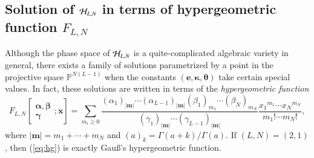 \documentclass[12pt]{article}
\numberwithin{equation}{section}
\begin{document}
\subsection{Solution of ${\cal H}_{L,N}$ in terms of hypergeometric function $F_{L,N}$}

\label{subsect:hg}


Although the phase space of ${\cal H}_{L,N}$
is a quite-complicated algebraic variety
in general,
there exists
a family of
solutions
parametrized by 
a point in the projective space
${\mathbb P}^{N(L-1)}$
when the constants $({\boldsymbol e},{\boldsymbol \kappa},{\boldsymbol \theta})$
take certain special values.
In fact, these solutions 
are written in terms of the {\it hypergeometric function} 
\begin{equation}
\label{eq:hg}
F_{L,N}
\left[
\begin{array}{c}
{\boldsymbol \alpha}, {\boldsymbol \beta} \\
{\boldsymbol  \gamma}
\end{array}
; {\boldsymbol x}
\right]
=
\sum_{m_i \geq0}
\frac{(\alpha_1)_{|{\boldsymbol m}|} \cdots (\alpha_{L-1})_{|{\boldsymbol m}|} (\beta_1)_{m_1} \cdots  (\beta_N)_{m_N} }{ (\gamma_1)_{| {\boldsymbol m}|} \cdots (\gamma_{L-1})_{| {\boldsymbol m}|} } 
\frac{{x_1}^{m_1} \cdots {x_N}^{m_N}}{{m_1}! \cdots {m_N}!},
\end{equation}
where
$|{\boldsymbol m}|=m_1+ \cdots +m_N$
and
$(a)_k=\Gamma(a+k)/\Gamma(a)$.
If $(L,N)=(2,1)$, then (\ref{eq:hg}) is exactly
Gau{\ss}'s 
hypergeometric function.
\end{document}
